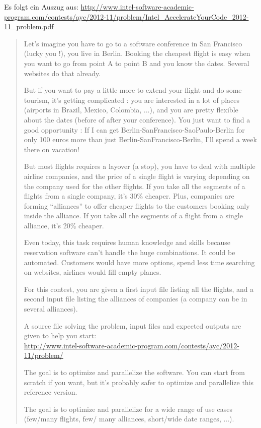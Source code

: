 \documentclass[11pt]{scrartcl}
\begin{document}
\label{intel_ayc_problem}

Es folgt ein Auszug aus:
\url{http://www.intel-software-academic-program.com/contests/ayc/2012-11/problem/Intel_AccelerateYourCode_2012-11_problem.pdf}

\begin{quote}
Let’s imagine you have to go to a software conference in San Francisco (lucky you !), you live in
Berlin. Booking the cheapest flight is easy when you want to go from point A to point B and you
know the dates. Several websites do that already.

But if you want to pay a little more to extend your flight and do some tourism, it’s getting
complicated : you are interested in a lot of places (airports in Brazil, Mexico, Colombia, ...), and
you are pretty flexible about the dates (before of after your conference). You just want to find
a good opportunity : If I can get Berlin-SanFrancisco-SaoPaulo-Berlin for only 100 euros more
than just Berlin-SanFrancisco-Berlin, I’ll spend a week there on vacation!

But most flights requires a layover (a stop), you have to deal with multiple airline companies,
and the price of a single flight is varying depending on the company used for the other flights. If
you take all the segments of a flights from a single company, it’s 30\% cheaper.
Plus, companies are forming “alliances” to offer cheaper flights to the customers booking
only inside the alliance. If you take all the segments of a flight from a single alliance, it’s 20\%
cheaper.

Even today, this task requires human knowledge and skills because reservation software can’t
handle the huge combinations. It could be automated. Customers would have more options,
spend less time searching on websites, airlines would fill empty planes.

For this contest, you are given a first input file listing all the flights, and a second input file listing
the alliances of companies (a company can be in several alliances).

A source file solving the problem, input files and expected outputs are given to help you start:\\
\url{http://www.intel-software-academic-program.com/contests/ayc/2012-11/problem/}

The goal is to optimize and parallelize the software. You can start from scratch if you want, but
it’s probably safer to optimize and parallelize this reference version.

The goal is to optimize and parallelize for a wide range of use cases (few/many flights, few/
many alliances, short/wide date ranges, ...).
\end{quote}
\end{document}
